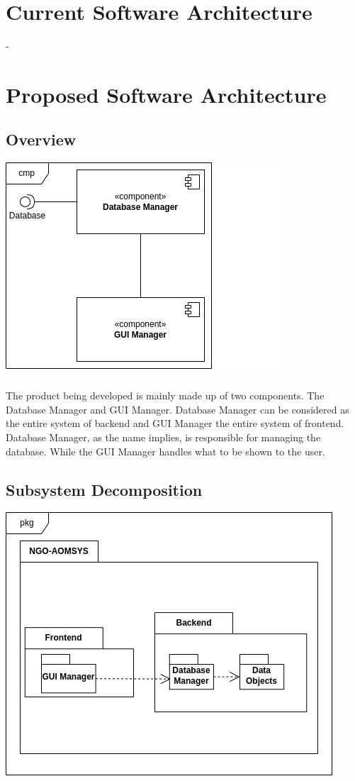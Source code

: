 \documentclass[a4paper,12pt]{report}
\begin{document}
	\chapter{Current Software Architecture}
		-
	\chapter{Proposed Software Architecture}
		\section{Overview}
			\includegraphics{component_diagram.png}
			\paragraph{}The product being developed is mainly made up of two components. The Database Manager and GUI Manager. Database Manager can be considered as the entire system of backend and GUI Manager the entire system of frontend. Database Manager, as the name implies, is responsible for managing the database. While the GUI Manager handles what to be shown to the user. 
		\section{Subsystem Decomposition}
			\includegraphics{subsystem_decomposition_diagram.png}
\end{document}
